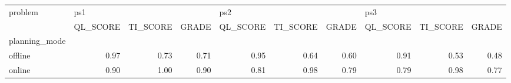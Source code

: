 \begin{tabular}{lrrrrrrrrr}
\toprule
problem & \multicolumn{3}{l}{ps1} & \multicolumn{3}{l}{ps2} & \multicolumn{3}{l}{ps3} \\
{} & QL\_SCORE & TI\_SCORE & GRADE & QL\_SCORE & TI\_SCORE & GRADE & QL\_SCORE & TI\_SCORE & GRADE \\
planning\_mode &          &          &       &          &          &       &          &          &       \\
\midrule
offline       &     0.97 &     0.73 &  0.71 &     0.95 &     0.64 &  0.60 &     0.91 &     0.53 &  0.48 \\
online        &     0.90 &     1.00 &  0.90 &     0.81 &     0.98 &  0.79 &     0.79 &     0.98 &  0.77 \\
\bottomrule
\end{tabular}
